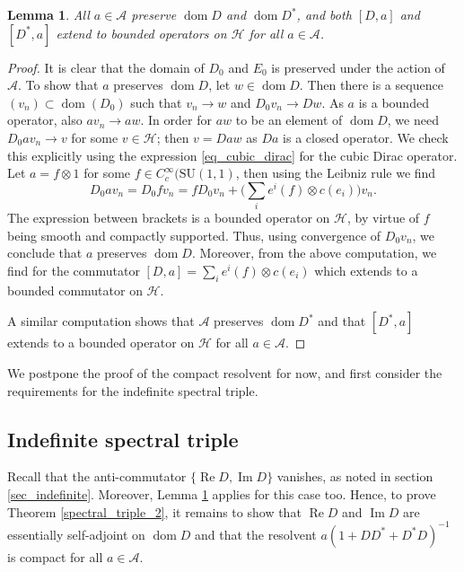 \documentclass{amsart}
\newtheorem{lemma}[theorem]{Lemma}
\theoremstyle{definition}
\theoremstyle{remark}
\DeclareMathOperator{\dom}{dom}
\DeclareMathOperator{\Ree}{Re}
\DeclareMathOperator{\Imm}{Im}
\numberwithin{equation}{section}
\begin{document}
\begin{lemma}\label{bounded_commutator}
    All $a\in\mathcal{A}$ preserve $\dom D$ and $\dom D^*$, and both $[D,a]$ and $[D^*,a]$ extend to bounded operators on $\mathcal{H}$ for all $a\in\mathcal{A}$.
\end{lemma}
\begin{proof}
    It is clear that the domain of $D_0$ and $E_0$ is preserved under the action of $\mathcal{A}$. To show that $a$ preserves $\dom D$, let $w\in\dom D$. Then there is a sequence $(v_n)\subset\dom(D_0)$ such that $v_n\rightarrow w$ and $D_0 v_n\rightarrow Dw$. As $a$ is a bounded operator, also $av_n\rightarrow aw$. In order for $aw$ to be an element of $\dom D$, we need $D_0av_n\rightarrow v$ for some $v\in \mathcal{H}$; then $v=Daw$ as $Da$ is a closed operator. We check this explicitly using the expression \eqref{eq_cubic_dirac} for the cubic Dirac operator. Let $a=f\otimes 1$ for some $f\in C_c^\infty(\mathrm{SU}(1,1)$, then using the Leibniz rule we find
    \begin{equation*}
        D_0av_n=D_0fv_n=fD_0v_n+\bigg(\sum_i e^i(f)\otimes c(e_i)\bigg)v_n.
    \end{equation*}
    The expression between brackets is a bounded operator on $\mathcal{H}$, by virtue of $f$ being smooth and compactly supported. Thus, using convergence of $D_0v_n$, we conclude that $a$ preserves $\dom D$. Moreover, from the above computation, we find for the commutator $[D,a]=\sum_i e^i(f)\otimes c(e_i)$ which extends to a bounded commutator on $\mathcal{H}$.

    A similar computation shows that $\mathcal{A}$ preserves $\dom D^*$ and that $[D^*,a]$ extends to a bounded operator on $\mathcal{H}$ for all $a\in\mathcal{A}$.
\end{proof}

We postpone the proof of the compact resolvent for now, and first consider the requirements for the indefinite spectral triple.

\subsection{Indefinite spectral triple} Recall that the anti-commutator $\{\Ree D,\Imm D\}$ vanishes, as noted in section \ref{sec_indefinite}. Moreover, Lemma \ref{bounded_commutator} applies for this case too. Hence, to prove Theorem \ref{spectral_triple_2}, it remains to show that $\Ree D$ and $\Imm D$ are essentially self-adjoint on $\dom D$ and that the resolvent $a(1+DD^*+D^*D)^{-1}$ is compact for all $a\in\mathcal{A}$. 
\end{document}
